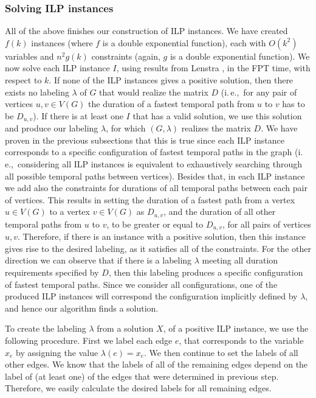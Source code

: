 \documentclass[a4paper,UKenglish,cleveref, autoref, thm-restate, anonymous]{lipics-v2021}
\newcommand{\ie}{i.\,e.,\ }
\begin{document}
\subsubsection{Solving ILP instances}
All of the above finishes our construction of ILP instances.
We have created $f(k)$ instances (where $f$ is a double exponential function), 
each with $O(k^2)$ variables and $n^2 g(k)$ constraints (again, $g$ is a double exponential function).
We now solve each ILP instance $I$, using results from Lenstra \cite{Lenstra1983Integer},
in the FPT time, with respect to $k$.
%
If none of the ILP instances gives a positive solution, then there exists no labeling $\lambda$ of $G$ that would realize the matrix $D$ (\ie for any pair of vertices $u,v \in V(G)$ the duration of a fastest temporal path from $u$ to $v$ has to be $D_{u,v}$).
If there is at least one $I$ that has a valid solution, 
we use this solution and produce our labeling $\lambda$, for which $(G,\lambda)$ realizes the matrix $D$.
We have proven in the previous subsections that this is true since each ILP instance corresponds to a specific configuration of fastest temporal paths in the graph (\ie considering all ILP instances is equivalent to exhaustively searching through all possible temporal paths between vertices).
Besides that, in each ILP instance we add also the constraints for durations of all temporal paths between each pair of vertices.
This results in setting the duration of a fastest path from a vertex $u \in V(G)$ to a vertex $v \in V(G)$ as $D_{u,v}$,
and the duration of all other temporal paths from $u$ to $v$, to be greater or equal to $D_{u,v}$,
for all pairs of vertices $u,v$.
Therefore, if there is an instance with a positive solution, then this instance gives rise to the desired labeling, as it satisfies all of the constraints.
For the other direction we can observe that if there is a labeling $\lambda$ meeting all duration requirements specified by $D$, then this labeling produces a specific configuration of fastest temporal paths. Since we consider all configurations, one of the produced ILP instances will correspond the configuration implicitly defined by $\lambda$, and hence our algorithm finds a solution.

To create the labeling $\lambda$ from a solution $X$, of a positive ILP instance,
we use the following procedure.
First we
label each edge $e$, that corresponds to the variable $x_e$
by assigning the value $\lambda(e) = x_e$.
We then continue to set the labels of all other edges. 
We know that the labels of all of the remaining edges depend on the label of (at least one) of the edges that were determined in previous step. 
Therefore, we easily calculate the desired labels for all remaining edges.
\end{document}
